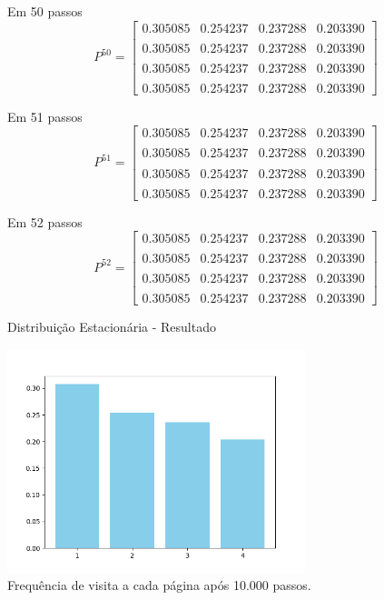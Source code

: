 \documentclass{beamer}
\begin{document}
\begin{frame}{Em 50 passos}
  \[
    P^{50} =
    \begin{bmatrix}
      0.305085 & 0.254237 & 0.237288 & 0.203390 \\\\
      0.305085 & 0.254237 & 0.237288 & 0.203390 \\\\
      0.305085 & 0.254237 & 0.237288 & 0.203390 \\\\
      0.305085 & 0.254237 & 0.237288 & 0.203390
    \end{bmatrix}
\]
\end{frame}
\begin{frame}{Em 51 passos}
  \[
    P^{51} =
    \begin{bmatrix}
      0.305085 & 0.254237 & 0.237288 & 0.203390 \\\\
      0.305085 & 0.254237 & 0.237288 & 0.203390 \\\\
      0.305085 & 0.254237 & 0.237288 & 0.203390 \\\\
      0.305085 & 0.254237 & 0.237288 & 0.203390
    \end{bmatrix}
\]
\end{frame}\begin{frame}{Em 52 passos}
  \[
    P^{52} =
    \begin{bmatrix}
      0.305085 & 0.254237 & 0.237288 & 0.203390 \\\\
      0.305085 & 0.254237 & 0.237288 & 0.203390 \\\\
      0.305085 & 0.254237 & 0.237288 & 0.203390 \\\\
      0.305085 & 0.254237 & 0.237288 & 0.203390
    \end{bmatrix}
\]
\end{frame}

\begin{frame}{Distribuição Estacionária - Resultado}
\begin{center}
\includegraphics[width=0.65\textwidth]{stationary_dist.png} \\
Frequência de visita a cada página após 10.000 passos.
\end{center}
\end{frame}
\end{document}
